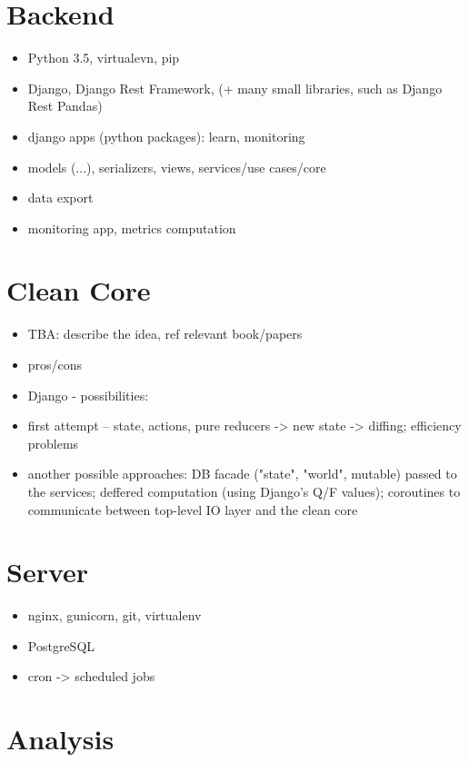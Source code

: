 \section{Backend}

\begin{itemize}
\item Python 3.5, virtualevn, pip
\item Django, Django Rest Framework, (+ many small libraries, such as Django Rest Pandas)
\item django apps (python packages): learn, monitoring
\item models (...), serializers, views, services/use cases/core
\item data export
\item monitoring app, metrics computation
\end{itemize}

\section{Clean Core}

\begin{itemize}
\item TBA: describe the idea, ref relevant book/papers
\item pros/cons
\item Django - possibilities:
\item first attempt -- state, actions, pure reducers -> new state -> diffing; efficiency problems
\item another possible approaches: DB facade ("state", "world", mutable) passed to the services;
  deffered computation (using Django's Q/F values); coroutines to communicate between top-level IO layer and the clean core
\end{itemize}


\section{Server}

\begin{itemize}
\item nginx, gunicorn, git, virtualenv
\item PostgreSQL
\item cron -> scheduled jobs
\end{itemize}


\section{Analysis}

